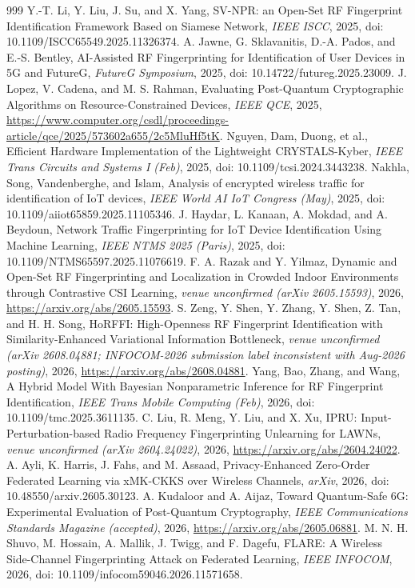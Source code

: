 \documentclass[10.5pt,compsoc,winfonts]{ICN}
\begin{document}
\begin{thebibliography}{999}
Y.-T. Li, Y. Liu, J. Su, and X. Yang, SV-NPR: an Open-Set RF Fingerprint Identification Framework Based on Siamese Network, \emph{IEEE ISCC}, 2025, doi: 10.1109/ISCC65549.2025.11326374.
A. Jawne, G. Sklavanitis, D.-A. Pados, and E.-S. Bentley, AI-Assisted RF Fingerprinting for Identification of User Devices in 5G and FutureG, \emph{FutureG Symposium}, 2025, doi: 10.14722/futureg.2025.23009.
J. Lopez, V. Cadena, and M. S. Rahman, Evaluating Post-Quantum Cryptographic Algorithms on Resource-Constrained Devices, \emph{IEEE QCE}, 2025, \url{https://www.computer.org/csdl/proceedings-article/qce/2025/573602a655/2c5MluHf5tK}.
Nguyen, Dam, Duong, et al., Efficient Hardware Implementation of the Lightweight CRYSTALS-Kyber, \emph{IEEE Trans Circuits and Systems I (Feb)}, 2025, doi: 10.1109/tcsi.2024.3443238.
Nakhla, Song, Vandenberghe, and Islam, Analysis of encrypted wireless traffic for identification of IoT devices, \emph{IEEE World AI IoT Congress (May)}, 2025, doi: 10.1109/aiiot65859.2025.11105346.
J. Haydar, L. Kanaan, A. Mokdad, and A. Beydoun, Network Traffic Fingerprinting for IoT Device Identification Using Machine Learning, \emph{IEEE NTMS 2025 (Paris)}, 2025, doi: 10.1109/NTMS65597.2025.11076619.
F. A. Razak and Y. Yilmaz, Dynamic and Open-Set RF Fingerprinting and Localization in Crowded Indoor Environments through Contrastive CSI Learning, \emph{venue unconfirmed (arXiv 2605.15593)}, 2026, \url{https://arxiv.org/abs/2605.15593}.
S. Zeng, Y. Shen, Y. Zhang, Y. Shen, Z. Tan, and H. H. Song, HoRFFI: High-Openness RF Fingerprint Identification with Similarity-Enhanced Variational Information Bottleneck, \emph{venue unconfirmed (arXiv 2608.04881; INFOCOM-2026 submission label inconsistent with Aug-2026 posting)}, 2026, \url{https://arxiv.org/abs/2608.04881}.
Yang, Bao, Zhang, and Wang, A Hybrid Model With Bayesian Nonparametric Inference for RF Fingerprint Identification, \emph{IEEE Trans Mobile Computing (Feb)}, 2026, doi: 10.1109/tmc.2025.3611135.
C. Liu, R. Meng, Y. Liu, and X. Xu, IPRU: Input-Perturbation-based Radio Frequency Fingerprinting Unlearning for LAWNs, \emph{venue unconfirmed (arXiv 2604.24022)}, 2026, \url{https://arxiv.org/abs/2604.24022}.
A. Ayli, K. Harris, J. Fahs, and M. Assaad, Privacy-Enhanced Zero-Order Federated Learning via xMK-CKKS over Wireless Channels, \emph{arXiv}, 2026, doi: 10.48550/arxiv.2605.30123.
A. Kudaloor and A. Aijaz, Toward Quantum-Safe 6G: Experimental Evaluation of Post-Quantum Cryptography, \emph{IEEE Communications Standards Magazine (accepted)}, 2026, \url{https://arxiv.org/abs/2605.06881}.
M. N. H. Shuvo, M. Hossain, A. Mallik, J. Twigg, and F. Dagefu, FLARE: A Wireless Side-Channel Fingerprinting Attack on Federated Learning, \emph{IEEE INFOCOM}, 2026, doi: 10.1109/infocom59046.2026.11571658.
\end{thebibliography}
\end{document}
